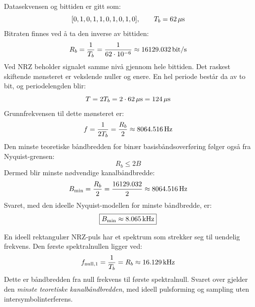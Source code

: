 Datasekvensen og bittiden er gitt som:
\[
    [0,1,0,1,1,0,1,0,1,0],\qquad T_b=62\,\mathrm{\mu s}
\]
Bitraten finnes ved å ta den inverse av bittiden:
\[
    R_b=\frac{1}{T_b}=\frac{1}{62\cdot10^{-6}}
       \approx16129.032\,\mathrm{bit/s}
\]
Ved NRZ beholder signalet samme nivå gjennom hele bittiden. Det raskest skiftende mønsteret er vekslende nuller og enere. En hel periode består da av to bit, og periodelengden blir:
\[
    T=2T_b=2\cdot62\,\mathrm{\mu s}=124\,\mathrm{\mu s}
\]
Grunnfrekvensen til dette mønsteret er:
\[
    f=\frac{1}{2T_b}=\frac{R_b}{2}
      \approx8064.516\,\mathrm{Hz}
\]
Den minste teoretiske båndbredden for binær basisbåndsoverføring følger også fra Nyquist-grensen:
\[
    R_b\leq2B
\]
Dermed blir minste nødvendige kanalbåndbredde:
\[
    B_{\min}=\frac{R_b}{2}
            =\frac{16129.032}{2}
            \approx8064.516\,\mathrm{Hz}
\]
Svaret, med den ideelle Nyquist-modellen for minste båndbredde, er:
\[
    \boxed{B_{\min}\approx8.065\,\mathrm{kHz}}
\]

En ideell rektangulær NRZ-puls har et spektrum som strekker seg til uendelig frekvens. Den første spektralnullen ligger ved:
\[
    f_{\mathrm{null},1}=\frac{1}{T_b}=R_b\approx16.129\,\mathrm{kHz}
\]
Dette er båndbredden fra null frekvens til første spektralnull. Svaret over gjelder den \emph{minste teoretiske kanalbåndbredden}, med ideell pulsforming og sampling uten intersymbolinterferens.

